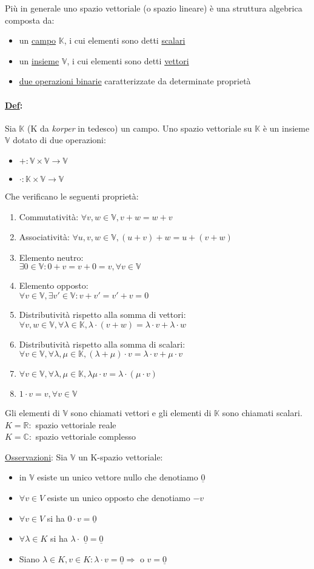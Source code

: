 \documentclass{article}
\newcommand{\ul}[1]{\underline{#1}}
\newcommand{\K}{\mathbb{K}}
\newcommand{\R}{\mathbb{R}}
\newcommand{\V}{\mathbb{V}}
\newcommand{\Def}[2]{\paragraph{\ul{Def}:}#1\\\hspace*{3em}\begin{minipage}{.8\textwidth}#2\end{minipage}}
\begin{document}
Più in generale uno spazio vettoriale (o spazio lineare) è una struttura algebrica composta da:
\begin{itemize}
	\item un \ul{campo} $\K$, i cui elementi sono detti \ul{scalari}
	\item un \ul{insieme} $\V$, i cui elementi sono detti \ul{vettori}
	\item \ul{due operazioni binarie} caratterizzate da determinate proprietà
\end{itemize}
\Def{Sia $\K$ (K da \textit{korper} in tedesco) un campo. Uno spazio vettoriale su $\K$ è un insieme $\V$ dotato di due operazioni:}{
	\begin{itemize}
		\item $+:\V\times\V\rightarrow\V$
		\item $\cdot:\K\times\V\rightarrow\V$
	\end{itemize}
	Che verificano le seguenti proprietà:
	\begin{enumerate}
		\item Commutatività: $\forall v,w\in\V, v+w=w+v$
		\item Associatività: $\forall u,v,w\in\V,(u+v)+w=u+(v+w)$
		\item Elemento neutro:\\$\exists0\in\V:0+v=v+0=v,\forall v\in\V$
		\item Elemento opposto:\\$\forall v\in\V,\exists v'\in\V:v+v'=v'+v=0$
		\item Distributività rispetto alla somma di vettori:\\$\forall v,w\in\V,\forall\lambda\in\K,\lambda\cdot(v+w)=\lambda\cdot v+\lambda\cdot w$
		\item Distributività rispetto alla somma di scalari:\\$\forall v\in\V,\forall\lambda,\mu\in\K,(\lambda+\mu)\cdot v=\lambda\cdot v+\mu\cdot v$
		\item $\forall v\in\V,\forall\lambda,\mu\in\K,\lambda\mu\cdot v=\lambda\cdot(\mu\cdot v)$
		\item $1\cdot v=v,\forall v\in\V$
	\end{enumerate}
	Gli elementi di $\V$ sono chiamati vettori e gli elementi di $\K$ sono chiamati scalari.\\
	$K=\R:$ spazio vettoriale reale\\
	$K=\mathbb{C}:$ spazio vettoriale complesso

	\ul{Osservazioni}: Sia $\V$ un K-spazio vettoriale:
	\begin{itemize}
		\item in $\V$ esiste un unico vettore nullo che denotiamo $\ul{0}$
		\item $\forall v\in V$ esiste un unico opposto che denotiamo $-v$
		\item $\forall v\in V$ si ha $0\cdot v=\ul{0}$
		\item $\forall\lambda\in K$ si ha $\lambda\cdot$ $\ul{0}=\ul{0}$
		\item Siano $\lambda\in K,v\in K:\lambda\cdot v=\ul{0}\Rightarrow$ o $v=\ul{0}$
	\end{itemize}
}
\end{document}
